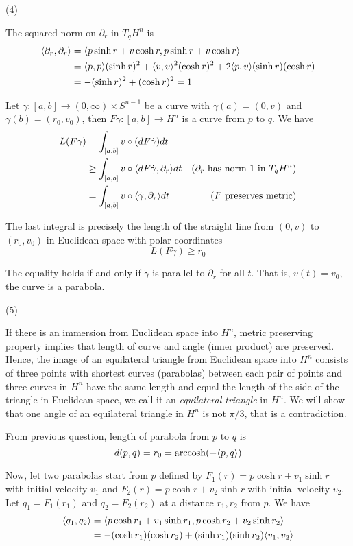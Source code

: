 \begin{longproof}
	(4)
	
	The squared norm on $\partial_r$ in $T_q H^n$ is
	\begin{align*}
		\langle\partial_r, \partial_r\rangle
		&= \langle p \sinh r + v \cosh r,  p \sinh r + v \cosh r\rangle \\
		&= \langle p, p\rangle (\sinh r)^2 + \langle v, v\rangle^2 (\cosh r)^2 + 2 \langle p, v\rangle (\sinh r) (\cosh r) \\
		&= - (\sinh r)^2 + (\cosh r)^2 = 1
	\end{align*}
	
	Let $\gamma: [a, b] \to (0, \infty) \times S^{n-1}$ be a curve with $\gamma(a) = (0, v)$ and $\gamma(b) = (r_0, v_0)$, then $F \gamma: [a, b] \to H^n$ is a curve from $p$ to $q$. We have
	\begin{align*}
		L(F \gamma) 
		&= \int_{[a, b]} v \circ (dF \dot{\gamma}) dt  \\
		&\geq \int_{[a, b]} v \circ \langle dF \dot{\gamma},  \partial_r\rangle dt &\text{($\partial_r$ has norm $1$ in $T_q H^n$)} \\
		&= \int_{[a, b]} v \circ \langle\dot{\gamma}, \partial_r\rangle dt &\text{($F$ preserves metric)} \\
	\end{align*}
	
	The last integral is precisely the length of the straight line from $(0, v)$ to $(r_0, v_0)$ in Euclidean space with polar coordinates
	$$
		L(F \gamma) \geq r_0
	$$
	
	The equality holds if and only if $\dot{\gamma}$ is parallel to $\partial_r$ for all $t$. That is, $v(t) = v_0$, the curve is a parabola.
	
	(5)
	
	If there is an immersion from Euclidean space into $H^n$, metric preserving property implies that length of curve and angle (inner product) are preserved. Hence, the image of an equilateral triangle from Euclidean space into $H^n$ consists of three points with shortest curves (parabolas) between each pair of points and three curves in $H^n$ have the same length and equal the length of the side of the triangle in Euclidean space, we call it an \textit{equilateral triangle} in $H^n$. We will show that one angle of an equilateral triangle in $H^n$ is not $\pi / 3$, that is a contradiction.
	
	From previous question, length of parabola from $p$ to $q$ is
	$$
		d(p, q) = r_0 = \operatorname{arccosh}(- \langle p, q\rangle) 
	$$
	
	Now, let two parabolas start from $p$ defined by $F_1(r) = p \cosh r + v_1 \sinh r$ with initial velocity $v_1$ and $F_2(r) = p \cosh r+ v_2 \sinh r$ with initial velocity $v_2$. Let $q_1 = F_1(r_1)$ and $q_2 = F_2(r_2)$ at a distance $r_1, r_2$ from $p$. We have
	\begin{align*}
		\langle q_1, q_2\rangle
		&= \langle p \cosh r_1 + v_1 \sinh r_1, p \cosh r_2 + v_2 \sinh r_2\rangle \\
		&= - (\cosh r_1)(\cosh r_2) +(\sinh r_1) (\sinh r_2) \langle v_1, v_2\rangle
	\end{align*}
	

\end{longproof}
